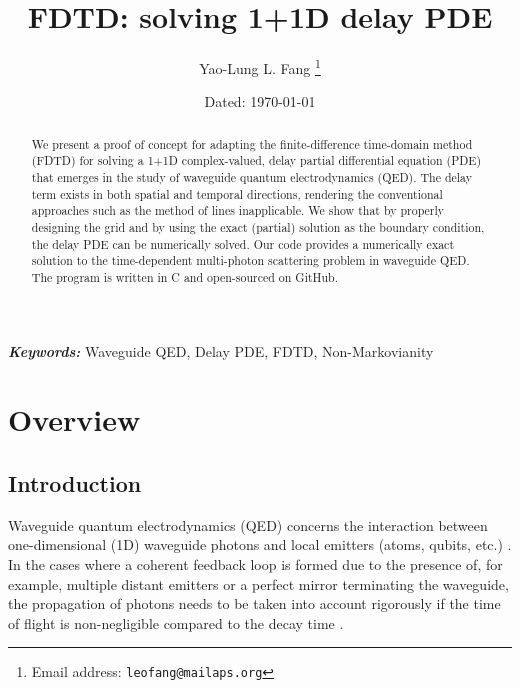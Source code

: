 \documentclass[12pt,letter,onecolumn,notitlepage]{article}
\providecommand{\keywords}[1]{\textbf{\textit{Keywords:}} #1}
\begin{document}
\title{FDTD: solving 1+1D delay PDE}
\author{Yao-Lung L. Fang 
	\thanks{Email address: \texttt{leofang@mailaps.org}}}
\date{\footnotesize Dated: \today}
\maketitle

\begin{abstract}
	We present a proof of concept for adapting the finite-difference time-domain method (FDTD) for solving a 1+1D complex-valued, delay partial differential equation (PDE) that emerges in the study of waveguide quantum electrodynamics (QED). The delay term exists in both spatial and temporal directions, rendering the conventional approaches such as the method of lines inapplicable. 
	We show that by properly designing the grid and by using the exact (partial) solution as the boundary condition, the delay PDE can be numerically solved. Our code provides a numerically exact solution to the time-dependent multi-photon scattering problem in waveguide QED. The program is written in C and open-sourced on GitHub.%
\end{abstract}

\keywords{Waveguide QED, Delay PDE, FDTD, Non-Markovianity}


\tableofcontents

\section{Overview}
\subsection{Introduction}
Waveguide quantum electrodynamics (QED) concerns the interaction between one-dimensional (1D) waveguide photons and local emitters (atoms, qubits, etc.) \cite{LodahlRMP15,RoyRMP17,NohRPP16,LiaoPhyScr16}. In the cases where a coherent feedback loop is formed due to the presence of, for example, multiple distant emitters or a perfect mirror terminating the waveguide, the propagation of photons needs to be taken into account rigorously if the time of flight is non-negligible compared to the decay time \cite{ZhengPRL13,TufarelliPRA14,FangPRA15,GrimsmoPRL15,RamosPRA16}.
\end{document}
